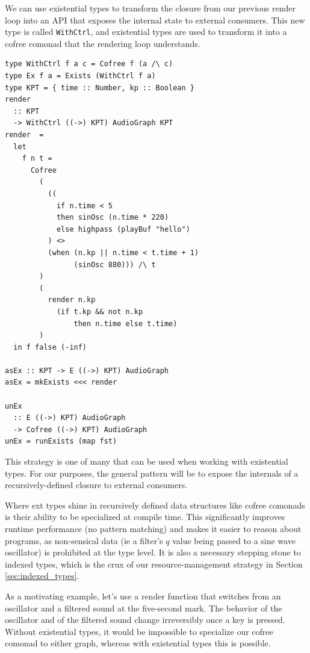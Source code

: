 \documentclass{article}
\begin{document}
We can use existential types to transform the closure from our previous render loop into an API that exposes the internal state to external consumers. This new type is called \texttt{WithCtrl}, and existential types are used to transform it into a cofree comonad that the rendering loop understands.

\lstset{language=Haskell, style=psstyle}
\begin{lstlisting}
type WithCtrl f a c = Cofree f (a /\ c)
type Ex f a = Exists (WithCtrl f a)
type KPT = { time :: Number, kp :: Boolean }
render
  :: KPT
  -> WithCtrl ((->) KPT) AudioGraph KPT
render  =
  let
    f n t =
      Cofree
        (
          ((
            if n.time < 5
            then sinOsc (n.time * 220)
            else highpass (playBuf "hello")
          ) <>
          (when (n.kp || n.time < t.time + 1)
                (sinOsc 880))) /\ t
        )
        (
          render n.kp
            (if t.kp && not n.kp
                then n.time else t.time)
        )
  in f false (-inf)

asEx :: KPT -> E ((->) KPT) AudioGraph
asEx = mkExists <<< render

unEx
  :: E ((->) KPT) AudioGraph
  -> Cofree ((->) KPT) AudioGraph
unEx = runExists (map fst)
\end{lstlisting}

This strategy is one of many that can be used when working with existential types. For our purposes, the general pattern will be to expose the internals of a recursively-defined closure to external consumers.

Where ext types shine in recursively defined data structures like cofree comonads is their ability to be specialized at compile time. This significantly improves runtime performance (no pattern matching) and makes it easier to reason about programs, as non-sensical data (ie a filter's $q$ value being passed to a sine wave oscillator) is prohibited at the type level. It is also a necessary stepping stone to indexed types, which is the crux of our resource-management strategy in Section \ref{sec:indexed_types}.

As a motivating example, let's use a render function that switches from an oscillator and a filtered sound at the five-second mark. The behavior of the oscillator and of the filtered sound change irreversibly once a key is pressed. Without existential types, it would be impossible to specialize our cofree comonad to either graph, whereas with existential types this is possible.
\end{document}
